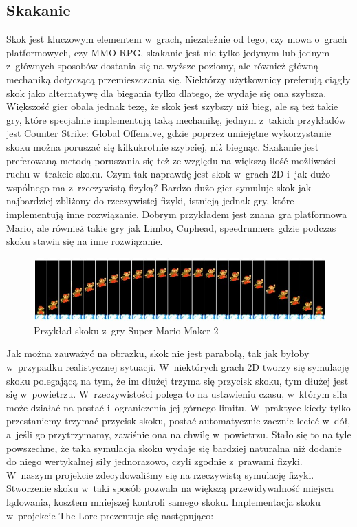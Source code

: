 \documentclass[oneside,polski,logo]{amuthesis}
\begin{document}
\subsection{Skakanie} 
Skok jest kluczowym elementem w~grach, niezależnie od tego, czy mowa o~grach platformowych, czy MMO-RPG, skakanie jest nie tylko jedynym lub jednym z~głównych sposobów dostania się na wyższe poziomy, ale również główną mechaniką dotyczącą przemieszczania się. Niektórzy użytkownicy preferują ciągły skok jako alternatywę dla biegania tylko dlatego, że wydaje się ona szybsza. Większość gier obala jednak tezę, że skok jest szybszy niż bieg, ale są też takie gry, które specjalnie implementują taką mechanikę, jednym z~takich przykładów jest Counter Strike: Global Offensive, gdzie poprzez umiejętne wykorzystanie skoku można poruszać się kilkukrotnie szybciej, niż biegnąc. Skakanie jest preferowaną metodą poruszania się też ze względu na większą ilość możliwości ruchu w~trakcie skoku.
Czym tak naprawdę jest skok w~grach 2D i~jak dużo wspólnego ma z~rzeczywistą fizyką? Bardzo dużo gier symuluje skok jak najbardziej zbliżony do rzeczywistej fizyki, istnieją jednak gry, które implementują inne rozwiązanie. Dobrym przykładem jest znana gra platformowa Mario, ale również takie gry jak Limbo, Cuphead, speedrunners gdzie podczas skoku stawia się na inne rozwiązanie. \cite{jumping1} 

\begin{figure}[h]
	\centering
	\includegraphics[width=13cm]{images/kozubal/mario.jpg}
	\caption{Przykład skoku z~gry Super Mario Maker 2 \cite{jumping3}}
\end{figure}

\newpage
Jak można zauważyć na obrazku, skok nie jest parabolą, tak jak byłoby w~przypadku realistycznej sytuacji. W~niektórych grach 2D tworzy się symulację skoku polegającą na tym, że im dłużej trzyma się przycisk skoku, tym dłużej jest się w~powietrzu. W~rzeczywistości polega to na ustawieniu czasu, w~którym siła może działać na postać i~ograniczenia jej górnego limitu. W~praktyce kiedy tylko przestaniemy trzymać przycisk skoku, postać automatycznie zacznie lecieć w~dół, a~jeśli go przytrzymamy, zawiśnie ona na chwilę w~powietrzu. Stało się to na tyle powszechne, że taka symulacja skoku wydaje się bardziej naturalna niż dodanie do niego wertykalnej siły jednorazowo, czyli zgodnie z~prawami fizyki. \cite{jumping2} \\ W~naszym projekcie zdecydowaliśmy się na rzeczywistą symulację fizyki. Stworzenie skoku w~taki sposób pozwala na większą przewidywalność miejsca lądowania, kosztem mniejszej kontroli samego skoku. Implementacja skoku w~projekcie The Lore prezentuje się następująco:
\end{document}
